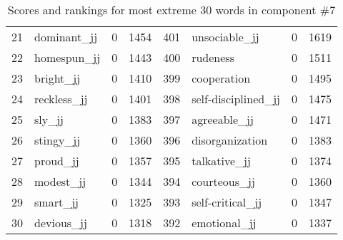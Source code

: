 \begin{table}[tbp]
\begin{tabular}{| rlr@{.}l | rlr@{.}l |}
    21 & dominant\_jj & 0 & 1454    &    401 & unsociable\_jj & 0 & 1619 \\
    22 & homespun\_jj & 0 & 1443    &    400 & rudeness & 0 & 1511 \\
    23 & bright\_jj & 0 & 1410    &    399 & cooperation & 0 & 1495 \\
    24 & reckless\_jj & 0 & 1401    &    398 & self-disciplined\_jj & 0 & 1475 \\
    25 & sly\_jj & 0 & 1383    &    397 & agreeable\_jj & 0 & 1471 \\
    26 & stingy\_jj & 0 & 1360    &    396 & disorganization & 0 & 1383 \\
    27 & proud\_jj & 0 & 1357    &    395 & talkative\_jj & 0 & 1374 \\
    28 & modest\_jj & 0 & 1344    &    394 & courteous\_jj & 0 & 1360 \\
    29 & smart\_jj & 0 & 1325    &    393 & self-critical\_jj & 0 & 1347 \\
    30 & devious\_jj & 0 & 1318    &    392 & emotional\_jj & 0 & 1337 \\
    \hline
    \end{tabular}
    \caption{Scores and rankings for most extreme 30 words in component \#7} 
\end{table}
\clearpage
